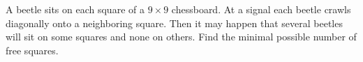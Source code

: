 A beetle sits on each square of a $9 \times 9$ chessboard. At a signal each beetle crawls diagonally onto a neighboring square. Then it may happen that several beetles will sit on some squares and none on others. Find the minimal possible number of free squares.
